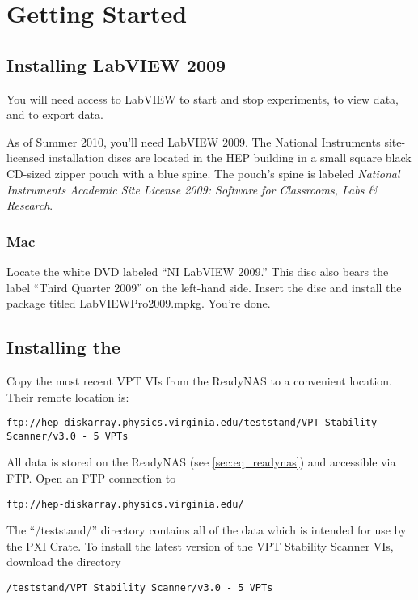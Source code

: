 \chapter{Getting Started}
\label{sec:op_start}

\section{Installing LabVIEW 2009}
You will need access to \gls{LabVIEW} to start and stop experiments, to view data, and to export data.

As of Summer 2010, you'll need \gls{LabVIEW} 2009.  The National Instruments site-licensed installation discs are located in the HEP building in a small square black CD-sized zipper pouch with a blue spine.  The pouch's spine is labeled \textit{National Instruments Academic Site License 2009: Software for Classrooms, Labs \& Research}.

\subsection{Mac}
\label{sec:LabViewMacLinux}

Locate the white DVD labeled ``NI LabVIEW 2009.''  This disc also bears the label ``Third Quarter 2009'' on the left-hand side.  Insert the disc and install the package titled LabVIEWPro2009.mpkg.  You're done.

\section{Installing the }
\label{sec:op_start:vptvi}

Copy the most recent \glspl{VPT VI} from the ReadyNAS to a convenient location.  Their remote location is:
\begin{verbatim}
ftp://hep-diskarray.physics.virginia.edu/teststand/VPT Stability Scanner/v3.0 - 5 VPTs
\end{verbatim} \noindent

All data is stored on the ReadyNAS (see \ref{sec:eq_readynas}) and accessible via FTP.  Open an FTP connection to
\begin{verbatim}
ftp://hep-diskarray.physics.virginia.edu/
\end{verbatim} \noindent

The ``/teststand/'' directory contains all of the data which is intended for use by the \gls{PXI Crate}.  To install the latest version of the VPT Stability Scanner VIs, download the directory 
\begin{verbatim}
/teststand/VPT Stability Scanner/v3.0 - 5 VPTs
\end{verbatim} \noindent

